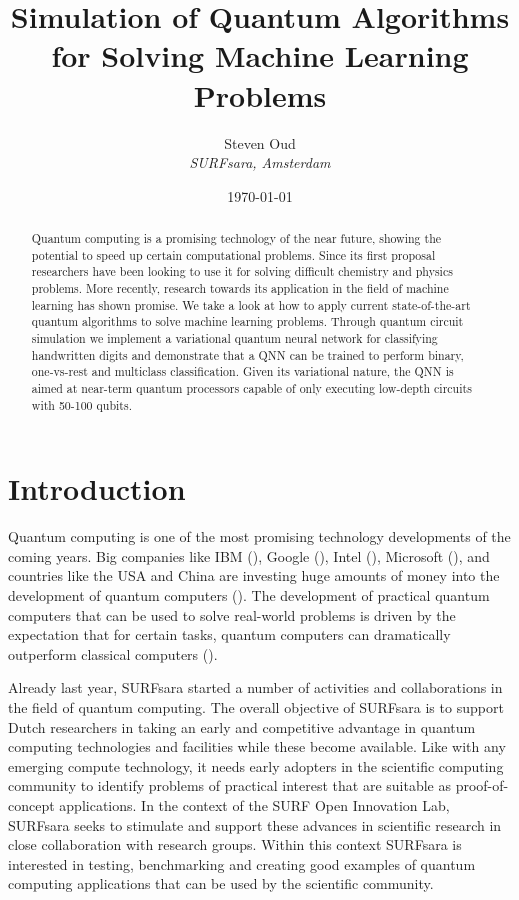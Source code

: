 \documentclass[a4paper,10pt]{article}
\title{Simulation of Quantum Algorithms for Solving Machine Learning Problems}
\author{Steven Oud \\ \emph{SURFsara, Amsterdam}}
\date{\today}
\begin{document}
\maketitle

\begin{abstract}
Quantum computing is a promising technology of the near future, showing the potential to speed up certain computational problems.
Since its first proposal researchers have been looking to use it for solving difficult chemistry and physics problems.
More recently, research towards its application in the field of machine learning has shown promise.
We take a look at how to apply current state-of-the-art quantum algorithms to solve machine learning problems.
Through quantum circuit simulation we implement a variational quantum neural network for classifying handwritten digits and demonstrate that a QNN can be trained to perform binary, one-vs-rest and multiclass classification.
Given its variational nature, the QNN is aimed at near-term quantum processors capable of only executing low-depth circuits with 50-100 qubits.
\end{abstract}

\tableofcontents

\clearpage

\section{Introduction}
Quantum computing is one of the most promising technology developments of the coming years.
Big companies like IBM (\cite{ibm-quantum}), Google (\cite{google-quantum}), Intel (\cite{intel-quantum}), Microsoft (\cite{microsoft-quantum}), and countries like the USA and China are investing huge amounts of money into the development of quantum computers (\cite{usa-quantum, china-quantum}).
The development of practical quantum computers that can be used to solve real-world problems is driven by the expectation that for certain tasks, quantum computers can dramatically outperform classical computers (\cite{preskill-qc}).

Already last year, SURFsara started a number of activities and collaborations in the field of quantum computing.
The overall objective of SURFsara is to support Dutch researchers in taking an early and competitive advantage in quantum computing technologies and facilities while these become available.
Like with any emerging compute technology, it needs early adopters in the scientific computing community to identify problems of practical interest that are suitable as proof-of-concept applications.
In the context of the SURF Open Innovation Lab, SURFsara seeks to stimulate and support these advances in scientific research in close collaboration with research groups.
Within this context SURFsara is interested in testing, benchmarking and creating good examples of quantum computing applications that can be used by the scientific community.
\end{document}
